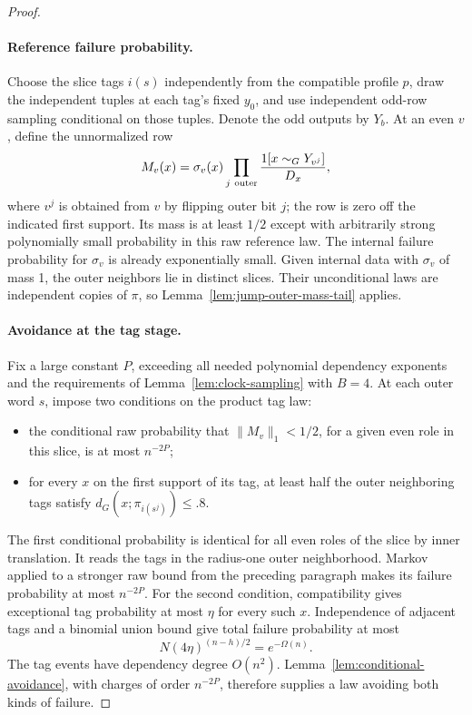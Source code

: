 \begin{proof}
\paragraph{Reference failure probability.}
Choose the slice tags \(i(s)\) independently from the compatible profile \(p\), draw the independent tuples at each tag's fixed \(y_0\), and use independent odd-row sampling conditional on those tuples. Denote the odd outputs by \(Y_b\). At an even \(v\), define the unnormalized row
\[
 M_v(x)=\sigma_v(x)\prod_{j\ {\rm outer}}
              \frac{1[x\sim_GY_{v^j}]}{D_x},
\]
where \(v^j\) is obtained from \(v\) by flipping outer bit \(j\); the row is zero off the indicated first support. Its mass is at least \(1/2\) except with arbitrarily strong polynomially small probability in this raw reference law. The internal failure probability for \(\sigma_v\) is already exponentially small. Given internal data with \(\sigma_v\) of mass 1, the outer neighbors lie in distinct slices. Their unconditional laws are independent copies of \(\pi\), so Lemma~\ref{lem:jump-outer-mass-tail} applies.

\paragraph{Avoidance at the tag stage.}
Fix a large constant \(P\), exceeding all needed polynomial dependency exponents and the requirements of Lemma~\ref{lem:clock-sampling} with \(B=4\). At each outer word \(s\), impose two conditions on the product tag law:
\begin{itemize}
\item the conditional raw probability that \(\|M_v\|_1<1/2\), for a given even role in this slice, is at most \(n^{-2P}\);
\item for every \(x\) on the first support of its tag, at least half the outer neighboring tags satisfy \(d_G(x;\pi_{i(s^j)})\le.8\).
\end{itemize}
The first conditional probability is identical for all even roles of the slice by inner translation. It reads the tags in the radius-one outer neighborhood. Markov applied to a stronger raw bound from the preceding paragraph makes its failure probability at most \(n^{-2P}\). For the second condition, compatibility gives exceptional tag probability at most \(\eta\) for every such \(x\). Independence of adjacent tags and a binomial union bound give total failure probability at most
\[
 N(4\eta)^{(n-h)/2}=e^{-\Omega(n)}.
\]
The tag events have dependency degree \(O(n^2)\). Lemma~\ref{lem:conditional-avoidance}, with charges of order \(n^{-2P}\), therefore supplies a law avoiding both kinds of failure.


\end{proof}
